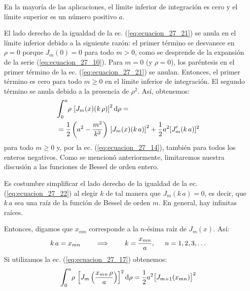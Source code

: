 \documentclass[12pt]{article}
\newcommand{\pderivada}[1]{\ensuremath{{#1}^{\prime}}}
\def\scaleint#1{\vcenter{\hbox{\scaleto[3ex]{\displaystyle\int}{#1}}}}
\def\bs{\mkern-12mu}
\numberwithin{equation}{section}
\begin{document}
En la mayoría de las aplicaciones, el límite inferior de integración es cero y el límite superior es un número positivo $a$. 
\par
El lado derecho de la igualdad de la ec. (\ref{eq:ecuacion_27_21}) se anula en el límite inferior debido a la siguiente razón: el primer término se desvanece en $\rho = 0$ porque $J_{m} (0) = 0$ para todo $m > 0$, como se desprende de la expansión de la serie (\ref{eq:ecuacion_27_10}). Para $m = 0$ (y $\rho = 0$), los paréntesis en el primer término de la ec. (\ref{eq:ecuacion_27_21}) se anulan.  Entonces, el primer término es cero para todo $m \geq 0$ en el límite inferior de integración. El segundo término se anula debido a la presencia de $\rho^{2}$.  Así, obtenemos:
\begin{align}
\begin{aligned}[b]
&\scaleint{6ex}_{\bs 0}^{a} \rho \, \left[J_{m} (x) ( k \, \rho) \right]^{2} \dd{\rho} = \\
&= \dfrac{1}{2} \left( a^{2} - \dfrac{m^{2}}{k^{2}} \right) \, \left[J_{m} (x) ( k \, a) \right]^{2} + \dfrac{1}{2} a^{2} [\pderivada{J}_{m} (k \, a)]^{2}
\end{aligned}
\label{eq:ecuacion_27_22}
\end{align}
para todo $m \geq 0$ y, por la ec. (\ref{eq:ecuacion_27_14}), también para todos los enteros negativos. Como se mencionó anteriormente, limitaremos nuestra discusión a las funciones de Bessel de orden entero.
\par
Es costumbre simplificar el lado derecho de la igualdad de la ec. (\ref{eq:ecuacion_27_22}) al elegir $k$ de tal manera que $J_{m} (k \, a) = 0$, es decir, que $k \, a$ sea una raíz de la función de Bessel de orden $m$. En general, hay infinitas raíces.
\par
Entonces, digamos que $x_{mn}$ corresponde a la $n$-ésima raíz de $J_m (x)$. Así:
\begin{align*}
k \, a = x_{mn} \hspace{0.75cm} \Longrightarrow \hspace{0.75cm} k = \dfrac{x_{mn}}{a}, \hspace{0.5cm} n = 1, 2, 3, \ldots
\end{align*}
Si utilizamos la ec. (\ref{eq:ecuacion_27_17}) obtenemos:
\begin{align}
\scaleint{6ex}_{\bs 0}^{a} \rho \, \left[ J_{m} \left(\dfrac{x_{mn} \, \rho}{a}  \right) \right]^{2} \dd{\rho} = \dfrac{1}{2} a^{2} \big[ J_{m+1} (x_{mn}) \big]^{2}
\label{eq:ecuacion_27_23}
\end{align}
\end{document}
